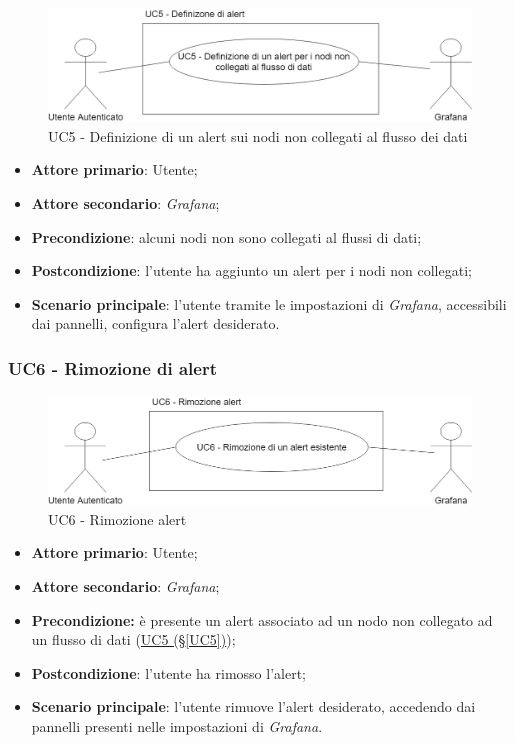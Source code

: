 \begin{figure}[H]
	\centering
	\includegraphics[scale=0.4]{./images/UC5.png}
	\caption{UC5 - Definizione di un alert sui nodi non collegati al flusso dei dati}
\end{figure}

\begin{itemize}
	\item \textbf{Attore primario}: Utente;
	\item \textbf{Attore secondario}: \textit{Grafana};
	\item \textbf{Precondizione}: alcuni nodi non sono collegati al flussi di dati;
	\item \textbf{Postcondizione}: l'utente ha aggiunto un alert per i nodi non collegati;
	\item \textbf{Scenario principale}: l'utente tramite le impostazioni di \textit{Grafana}, accessibili dai pannelli, configura l'alert desiderato.
\end{itemize}

\newpage

\subsubsection{UC6 - Rimozione di alert}\label{UC6}

\begin{figure}[H]
	\centering
	\includegraphics[scale=0.4]{./images/UC6.png}
	\caption{UC6 - Rimozione alert}
\end{figure}

\begin{itemize}
	\item \textbf{Attore primario}: Utente;
	\item \textbf{Attore secondario}: \textit{Grafana};
	\item \textbf{Precondizione:} è presente un alert associato ad un nodo non collegato ad un flusso di dati
	(\hyperref[UC5]{UC5 (§\ref*{UC5})});
	\item \textbf{Postcondizione}: l'utente ha rimosso l'alert;
	\item \textbf{Scenario principale}: l'utente rimuove l'alert desiderato, accedendo dai pannelli presenti nelle impostazioni di \textit{Grafana}.
\end{itemize}

